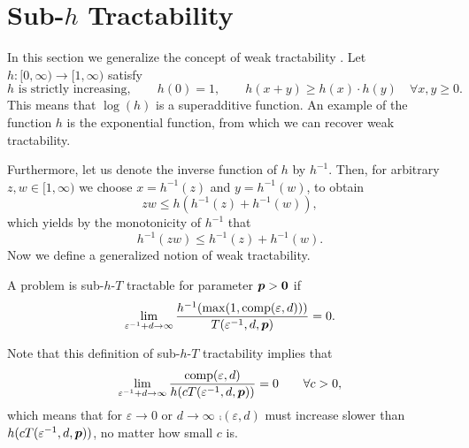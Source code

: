 \documentclass[11pt,a4paper]{article}
\begin{document}
\section{Sub-$h$ Tractability}\label{sec:subh}
In this section we generalize the concept of weak tractability \cite{}.  Let  $h:[0,\infty) \to [1,\infty)$ satisfy
\begin{equation} \label{eq:h_cond}
	h \text{ is strictly increasing}, \qquad
	h(0)=1, \qquad
 h(x+y) \ge  h(x)\cdot h(y)  \quad \forall x,y \ge 0.
\end{equation}
This means that $\log(h)$ is a superadditive function.  An example of the function $h$ is the exponential function, from which we can recover weak tractability.

Furthermore, let us denote the inverse function of $h$ by $h^{-1}$.
Then, for arbitrary $z,w \in [1,\infty)$ we choose $x=h^{-1}(z)$ and $y=h^{-1}(w)$, to obtain
\[
z w \le h (h^{-1}(z)+h^{-1}(w)),
\]
which yields by the monotonicity of $h^{-1}$ that
\begin{equation}\label{eq:submult_h_inverse}
h^{-1}(z w) \le h^{-1}(z)+h^{-1}(w).
\end{equation}
Now we define a generalized notion of weak tractability.
\begin{definition} \label{def:subhT}
	A problem is sub-$h$-$T$ tractable for parameter $\boldsymbol{p} > \boldsymbol{0}$ if
	\begin{equation*}
		\lim_{\varepsilon^{-1} + d \to \infty} \frac{h^{-1}(\max(1,\operatorname{comp}(\varepsilon,d)))}{T(\varepsilon^{-1},d,\boldsymbol{p})} = 0.
	\end{equation*}
\end{definition}

Note that this definition of sub-$h$-$T$ tractability implies that
\begin{equation} \label{eq:comp_slow_hcT}
		\lim_{\varepsilon^{-1} + d \to \infty} \frac{\operatorname{comp}(\varepsilon,d)}{h(cT(\varepsilon^{-1},d,\boldsymbol{p}))} = 0 \qquad \forall c > 0,
\end{equation}
which means that for $\varepsilon \to 0$ or $d \to \infty$  $\comp(\varepsilon,d)$ must increase slower than $h(cT(\varepsilon^{-1},d,\boldsymbol{p}))$, no matter how small $c$ is.
\end{document}

